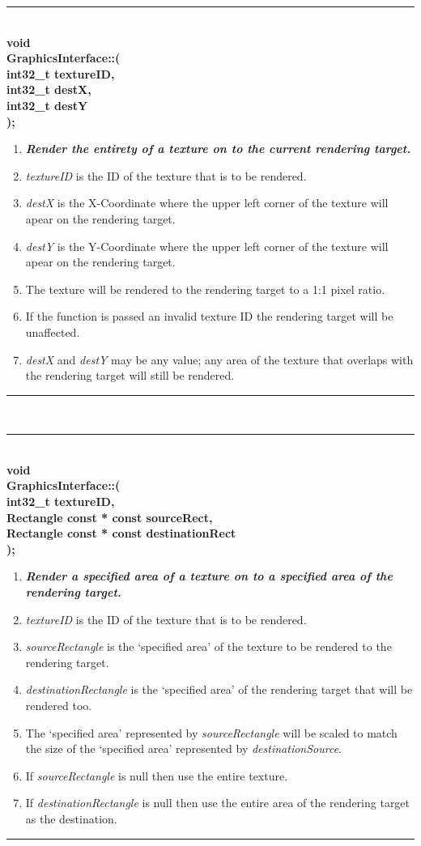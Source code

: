 \documentclass[12pt]{article}
\newcommand{\param}[1]{\indent\phantom{indent} \textbf{#1}\\ }
\newenvironment{func}[4]%
{%
	\noindent\ignorespaces
	\begin{minipage}[b]{\linewidth}
	\rule{\textwidth} {1pt} \\
	\textbf{#1\\#2::{\Large \color{blue}{#3}}(} \\
	\textbf{#4);} \\
	\noindent\ignorespaces
}%
{%
	\ignorespacesafterend
	\rule{\textwidth} {0.01pt} \\
	\end{minipage}
}
\begin{document}
\begin{func}{void}{GraphicsInterface}{basicRenderCopy}
{
	\param{int32\_t textureID,}
	\param{int32\_t destX,}
	\param{int32\_t destY}
}
\begin{enumerate}
\item[]\textit{\textbf{Render the entirety of a texture on to the current rendering target.}}
\item \textit{textureID} is the ID of the texture that is to be rendered.
\item \textit{destX} is the X-Coordinate where the upper left corner of the texture will apear on the rendering target.
\item \textit{destY} is the Y-Coordinate where the upper left corner of the texture will apear on the rendering target.
\item The texture will be rendered to the rendering target to a 1:1 pixel ratio.
\item If the function is passed an invalid texture ID the rendering target will be unaffected.
\item \textit{destX} and \textit{destY} may be any value; any area of the texture that overlaps with the rendering target will still be rendered.
\end{enumerate}
\end{func}

\begin{func}{void}{GraphicsInterface}{renderCopy}
{
	\param{int32\_t textureID,}
	\param{Rectangle const * const sourceRect,}
	\param{Rectangle const * const destinationRect}
}
\begin{enumerate}
\item[]\textit{\textbf{Render a specified area of a texture on to a specified area of the rendering target.}}
\item \textit{textureID} is the ID of the texture that is to be rendered.
\item \textit{sourceRectangle} is the `specified area' of the texture to be rendered to the rendering target.
\item \textit{destinationRectangle} is the `specified area' of the rendering target that will be rendered too.
\item The `specified area' represented by \textit{sourceRectangle} will be scaled to match the size of the `specified area' represented by \textit{destinationSource}.
\item If \textit{sourceRectangle} is null then use the entire texture. {\color{red}{(?)}}
\item If \textit{destinationRectangle} is null then use the entire area of the rendering target as the destination. {\color{red}{(?)}}
\end{enumerate}
\end{func}
\end{document}
